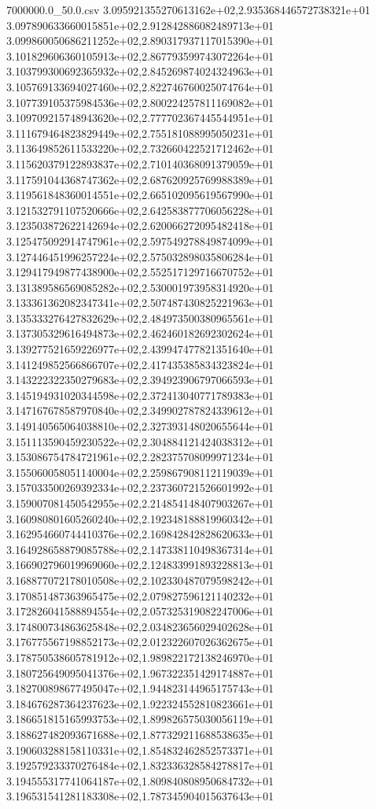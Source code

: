 \begin{filecontents*}{7000000.0_50.0.csv}
3.095921355270613162e+02,2.935368446572738321e+01
3.097890633660015851e+02,2.912842886082489713e+01
3.099860050686211252e+02,2.890317937117015390e+01
3.101829606360105913e+02,2.867793599743072264e+01
3.103799300692365932e+02,2.845269874024324963e+01
3.105769133694027460e+02,2.822746760025074764e+01
3.107739105375984536e+02,2.800224257811169082e+01
3.109709215748943620e+02,2.777702367445544951e+01
3.111679464823829449e+02,2.755181088995050231e+01
3.113649852611533220e+02,2.732660422521712462e+01
3.115620379122893837e+02,2.710140368091379059e+01
3.117591044368747362e+02,2.687620925769988389e+01
3.119561848360014551e+02,2.665102095619567990e+01
3.121532791107520666e+02,2.642583877706056228e+01
3.123503872622142694e+02,2.620066272095482418e+01
3.125475092914747961e+02,2.597549278849874099e+01
3.127446451996257224e+02,2.575032898035806284e+01
3.129417949877438900e+02,2.552517129716670752e+01
3.131389586569085282e+02,2.530001973958314920e+01
3.133361362082347341e+02,2.507487430825221963e+01
3.135333276427832629e+02,2.484973500380965561e+01
3.137305329616494873e+02,2.462460182692302624e+01
3.139277521659226977e+02,2.439947477821351640e+01
3.141249852566866707e+02,2.417435385834323824e+01
3.143222322350279683e+02,2.394923906797066593e+01
3.145194931020344598e+02,2.372413040771789383e+01
3.147167678587970840e+02,2.349902787824339612e+01
3.149140565064038810e+02,2.327393148020655644e+01
3.151113590459230522e+02,2.304884121424038312e+01
3.153086754784721961e+02,2.282375708099971234e+01
3.155060058051140004e+02,2.259867908112119039e+01
3.157033500269392334e+02,2.237360721526601992e+01
3.159007081450542955e+02,2.214854148407903267e+01
3.160980801605260240e+02,2.192348188819960342e+01
3.162954660744410376e+02,2.169842842828620633e+01
3.164928658879085788e+02,2.147338110498367314e+01
3.166902796019969060e+02,2.124833991893228813e+01
3.168877072178010508e+02,2.102330487079598242e+01
3.170851487363965475e+02,2.079827596121140232e+01
3.172826041588894554e+02,2.057325319082247006e+01
3.174800734863625848e+02,2.034823656029402628e+01
3.176775567198852173e+02,2.012322607026362675e+01
3.178750538605781912e+02,1.989822172138246970e+01
3.180725649095041376e+02,1.967322351429174887e+01
3.182700898677495047e+02,1.944823144965175743e+01
3.184676287364237623e+02,1.922324552810823661e+01
3.186651815165993753e+02,1.899826575030056119e+01
3.188627482093671688e+02,1.877329211688538635e+01
3.190603288158110331e+02,1.854832462852573371e+01
3.192579233370276484e+02,1.832336328584278817e+01
3.194555317741064187e+02,1.809840808950684732e+01
3.196531541281183308e+02,1.787345904015637643e+01

\end{filecontents*}
